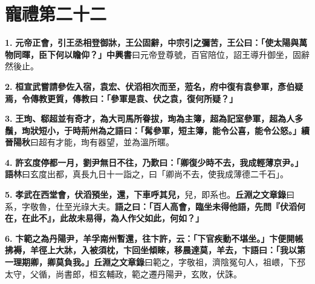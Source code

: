 \chapter{寵禮第二十二}

\textbf{1.} \textbf{元帝正會，引王丞相登御牀，王公固辭，中宗引之彌苦，王公曰：「使太陽與萬物同暉，臣下何以瞻仰？」}{\footnotesize \textbf{中興書}曰元帝登尊號，百官陪位，詔王導升御坐，固辭然後止。}

\textbf{2.} \textbf{桓宣武嘗請參佐入宿，袁宏、伏滔相次而至，蒞名，府中復有袁參軍，彥伯疑焉，令傳教更質，傳教曰：「參軍是袁、伏之袁，復何所疑？」}

\textbf{3.} \textbf{王珣、郗超並有奇才，為大司馬所眷拔，珣為主簿，超為記室參軍，超為人多鬚，珣狀短小，于時荊州為之語曰：「髯參軍，短主簿，能令公喜，能令公怒。」}{\footnotesize \textbf{續晉陽秋}曰超有才能，珣有器望，並為溫所暱。}

\textbf{4.} \textbf{許玄度停都一月，劉尹無日不往，乃歎曰：「卿復少時不去，我成輕薄京尹。」}{\footnotesize \textbf{語林}曰玄度出都，真長九日十一詣之，曰「卿尚不去，使我成薄德二千石」。}

\textbf{5.} \textbf{孝武在西堂會，伏滔預坐，還，下車呼其兒，}{\footnotesize 兒，即系也。\textbf{丘淵之文章錄}曰系，字敬魯，仕至光祿大夫。}\textbf{語之曰：「百人高會，臨坐未得他語，先問『伏滔何在，在此不』，此故未易得，為人作父如此，何如？」}

\textbf{6.} \textbf{卞範之為丹陽尹，羊孚南州暫還，往卞許，云：「下官疾動不堪坐。」卞便開帳拂褥，羊徑上大牀，入被須枕，卞回坐傾睞，移晨達莫，羊去，卞語曰：「我以第一理期卿，卿莫負我。」}{\footnotesize \textbf{丘淵之文章錄}曰範之，字敬祖，濟陰冤句人，祖㟪，下邳太守，父循，尚書郎，桓玄輔政，範之遷丹陽尹，玄敗，伏誅。}